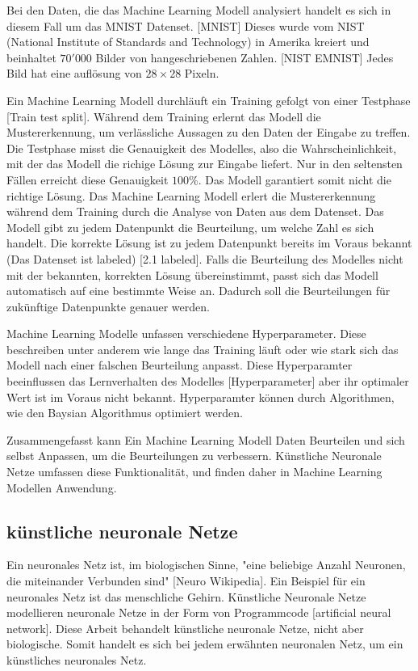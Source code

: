 Bei den Daten, die das Machine Learning Modell analysiert handelt es sich in
diesem Fall um das MNIST Datenset. [MNIST]  Dieses wurde vom NIST (National
Institute of Standards and Technology) in Amerika kreiert und beinhaltet
$70'000$ Bilder von hangeschriebenen Zahlen. [NIST EMNIST] Jedes Bild hat eine
auflösung von $28\times28$ Pixeln.
                

Ein Machine Learning Modell durchläuft ein Training gefolgt von einer Testphase
[Train test split]. Während dem Training erlernt das Modell die Mustererkennung,
um verlässliche Aussagen zu den Daten der Eingabe zu treffen. Die Testphase
misst die Genauigkeit des Modelles, also die Wahrscheinlichkeit, mit der das
Modell die richige Lösung zur Eingabe liefert. Nur in den seltensten Fällen
erreicht diese Genauigkeit $100\%$. Das Modell garantiert somit nicht die
richtige Lösung. Das Machine Learning Modell erlert die Mustererkennung während
dem Training durch die Analyse von Daten aus dem Datenset. Das Modell gibt zu
jedem Datenpunkt die Beurteilung, um welche Zahl es sich handelt. Die korrekte
Lösung ist zu jedem Datenpunkt bereits im Voraus bekannt (Das Datenset ist
labeled) [2.1 labeled]. Falls die Beurteilung des Modelles nicht mit der
bekannten, korrekten Lösung übereinstimmt, passt sich das Modell automatisch auf
eine bestimmte Weise an. Dadurch soll die Beurteilungen für zukünftige
Datenpunkte genauer werden.

Machine Learning Modelle unfassen verschiedene Hyperparameter. Diese beschreiben
unter anderem wie lange das Training läuft oder wie stark sich das Modell nach
einer falschen Beurteilung anpasst. Diese Hyperparamter beeinflussen das
Lernverhalten des Modelles [Hyperparameter] aber ihr optimaler Wert ist im
Voraus nicht bekannt. Hyperparamter können durch Algorithmen, wie den Baysian
Algorithmus optimiert werden.

Zusammengefasst kann Ein Machine Learning Modell Daten Beurteilen und sich
selbst Anpassen, um die Beurteilungen zu verbessern. Künstliche Neuronale Netze
umfassen diese Funktionalität, und finden daher in Machine Learning Modellen
Anwendung.


\subsection{künstliche neuronale Netze}

Ein neuronales Netz ist, im biologischen Sinne, "eine beliebige Anzahl Neuronen,
die miteinander Verbunden sind" [Neuro Wikipedia]. Ein Beispiel für ein
neuronales Netz ist das menschliche Gehirn. Künstliche Neuronale Netze
modellieren neuronale Netze in der Form von Programmcode [artificial neural
network]. Diese Arbeit behandelt künstliche neuronale Netze, nicht aber
biologische. Somit handelt es sich bei jedem erwähnten neuronalen Netz, um ein
künstliches neuronales Netz.

